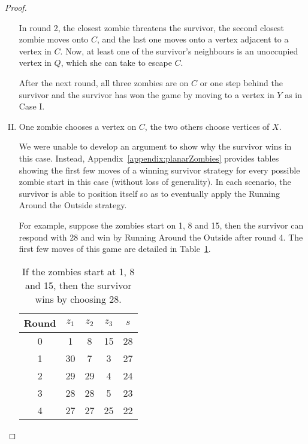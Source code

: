 \begin{proof}
\begin{enumerate}[I.]
In round 2, the closest zombie threatens the survivor, the second closest zombie moves onto $C$, and the last one moves onto a vertex adjacent to a vertex in $C$. Now, at least one of the survivor's neighbours is an unoccupied vertex in $Q$, which she can take to escape $C$.

After the next round, all three zombies are on $C$ or one step behind the survivor and the survivor has won the game by moving to a vertex in $Y$
as in Case I.

\item One zombie chooses a vertex on $C$, the two others choose vertices of $X$.\label{planar case 4}

We were unable to develop an argument to show why the survivor wins in this case.
Instead, Appendix~\ref{appendix:planarZombies} provides tables showing the first few moves of a winning survivor strategy
for every possible zombie start in this case (without loss of generality). In each scenario, the survivor is able to position itself so as to eventually apply the Running Around the Outside strategy.

For example, suppose the zombies start on 1, 8 and 15, then the survivor can respond with 28 and win by Running Around the Outside after round 4. The first few moves of this game are detailed in Table~\ref{table start 1 8 15}.
\begin{table}
\begin{tabular}{c | c | c | c | c }
Round & $z_1$ & $z_2$ & $z_3$ & $s$ \\
\hline
0 & 1 & 8 & 15 & 28 \\
1 & 30 & 7 & 3 & 27 \\
2 & 29 & 29 & 4 & 24 \\
3 & 28 & 28 & 5 & 23 \\
4 & 27 & 27 & 25 & 22 \\
\end{tabular}
\caption{If the zombies start at 1, 8 and 15, then the survivor wins by choosing 28. \label{table start 1 8 15}}
\end{table}

\end{enumerate}
\end{proof}
